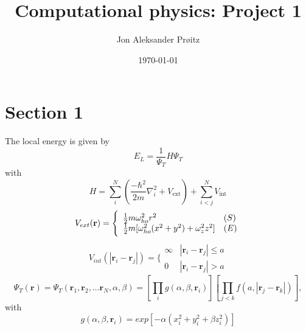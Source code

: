 \documentclass[a4paper, 10pt, english]{revtex4-2} %
\newcommand{\txt}[1]{\text{#1}}
\begin{document}
\vspace*{1.5cm}
\title{\LARGE Computational physics: Project 1}
\author{Jon Aleksander Prøitz}
\date{\today}
\noaffiliation
\maketitle

\section*{\large Section 1}
    The local energy is given by
    \begin{equation}
            E_L 
        =   \frac{1}{\Psi_T}H\Psi_T
    \end{equation}
    with
    \begin{equation}
            H
        =   \sum_i^N \left(\frac{-\hbar^2}{2m} \nabla_i^2 + V_\txt{ext}\right) + \sum_{i<j}^N V_\txt{int}
    \end{equation}
    \begin{equation}
            V_{ext}(\mathbf{r}) 
        =   \Bigg\{
        \begin{array}{ll}
            \frac{1}{2}m\omega_{ho}^2r^2 & (S)\\
        \strut
            \frac{1}{2}m[\omega_{ho}^2(x^2+y^2) + \omega_z^2z^2] & (E)
        \label{trap_eqn}
        \end{array}
    \end{equation}
    \begin{equation}
        V_{int}(|\mathbf{r}_i-\mathbf{r}_j|) =  \Bigg\{
        \begin{array}{ll}
            \infty & {|\mathbf{r}_i-\mathbf{r}_j|} \leq {a}\\
            0 & {|\mathbf{r}_i-\mathbf{r}_j|} > {a}
        \end{array}
    \end{equation}
    \begin{equation}
        \Psi_T(\mathbf{r})=\Psi_T(\mathbf{r}_1, \mathbf{r}_2, \dots \mathbf{r}_N,\alpha,\beta)
        =\left[
           \prod_i g(\alpha,\beta,\mathbf{r}_i)
        \right]
        \left[
           \prod_{j<k}f(a,|\mathbf{r}_j-\mathbf{r}_k|)
        \right],
        \label{eq:trialwf}
    \end{equation}
    with 
    \begin{equation}
            g(\alpha, \beta, \mathbf{r}_i)
        =   exp\left[-\alpha\left(x_i^2+y_i^2+\beta z_i^2\right)\right]
    \end{equation}
\end{document}
